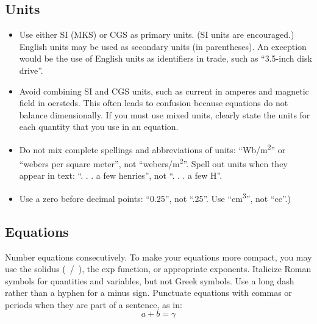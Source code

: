 \documentclass[conference]{IEEEtran}
\renewcommand{\vec}[1]{\ensuremath{\boldsymbol{#1}}} %
\def \myneq {\skew{-2}\not =} %
\begin{document}
{\subsection{Units}
\begin{itemize}
\item Use either SI (MKS) or CGS as primary units. (SI units are encouraged.) English units may be used as secondary units (in parentheses). An exception would be the use of English units as identifiers in trade, such as ``3.5-inch disk drive''.
\item Avoid combining SI and CGS units, such as current in amperes and magnetic field in oersteds. This often leads to confusion because equations do not balance dimensionally. If you must use mixed units, clearly state the units for each quantity that you use in an equation.
\item Do not mix complete spellings and abbreviations of units: ``Wb/m\textsuperscript{2}'' or ``webers per square meter'', not ``webers/m\textsuperscript{2}''. Spell out units when they appear in text: ``. . . a few henries'', not ``. . . a few H''.
\item Use a zero before decimal points: ``0.25'', not ``.25''. Use ``cm\textsuperscript{3}'', not ``cc''.)
\end{itemize}

\subsection{Equations}
Number equations consecutively. To make your 
equations more compact, you may use the solidus (~/~), the exp function, or 
appropriate exponents. Italicize Roman symbols for quantities and variables, 
but not Greek symbols. Use a long dash rather than a hyphen for a minus 
sign. Punctuate equations with commas or periods when they are part of a 
sentence, as in:
\begin{equation}
a+b=\gamma\label{eq}
\end{equation}


  }
\end{document}
